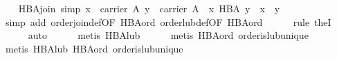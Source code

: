\begin{isabellebody}
\endisatagproof
{\isafoldproof}%
%
\isadelimproof
\isanewline
%
\endisadelimproof
\isanewline
\ \ \isamarkupfalse%
\ HBA{}join\ {}simp{}{}\ {}{}x\ {}\ carrier\ A{}\ y\ {}\ carrier\ A{}\ {}\ x\ {}\isactrlbsub HBA\isactrlesub \ y\ {}\ x\ {}\ y{}\isanewline
%
\isadelimproof
\ \ \ \ %
\endisadelimproof
%
\isatagproof
{}\isamarkupfalse%
\ {}simp\ add{}\ order{}join{}def{}OF\ HBA{}ord{}\ order{}lub{}def{}OF\ HBA{}ord{}{}\isanewline
\ \ \ \ \isamarkupfalse%
\ {}rule\ the{}I{}{}\isanewline
\ \ \ \ \isamarkupfalse%
\ auto\isanewline
\ \ \ \ \isamarkupfalse%
\ {}metis\ HBA{}lub{}\isanewline
\ \ \ \ \isamarkupfalse%
\ {}metis\ HBA{}ord\ order{}is{}lub{}unique{}\isanewline
\ \ \ \ \isamarkupfalse%
\ {}metis\ HBA{}lub\ HBA{}ord\ order{}is{}lub{}unique{}%
\endisatagproof

\end{isabellebody}
